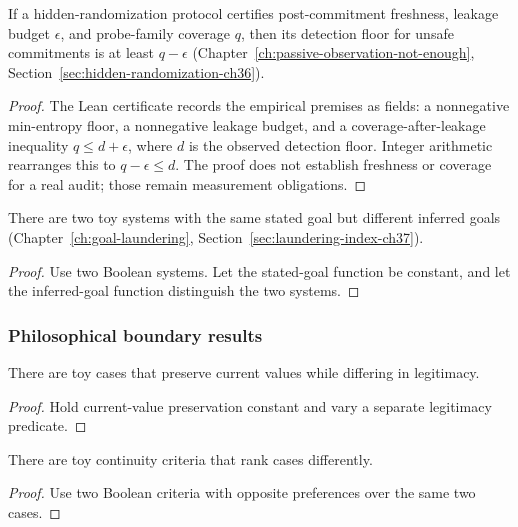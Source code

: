 \begin{theorem}
\label{appi:thm:p36r}
If a hidden-randomization protocol certifies post-commitment freshness, leakage budget \(\epsilon\), and probe-family coverage \(q\), then its detection floor for unsafe commitments is at least \(q-\epsilon\) (Chapter~\ref{ch:passive-observation-not-enough}, Section~\ref{sec:hidden-randomization-ch36}).
\end{theorem}
\begin{proof}
The Lean certificate records the empirical premises as fields: a nonnegative min-entropy floor, a nonnegative leakage budget, and a coverage-after-leakage inequality \(q\leq d+\epsilon\), where \(d\) is the observed detection floor. Integer arithmetic rearranges this to \(q-\epsilon\leq d\). The proof does not establish freshness or coverage for a real audit; those remain measurement obligations.
\end{proof}

\begin{theorem}
\label{appi:thm:p37}
There are two toy systems with the same stated goal but different inferred goals (Chapter~\ref{ch:goal-laundering}, Section~\ref{sec:laundering-index-ch37}).
\end{theorem}
\begin{proof}
Use two Boolean systems. Let the stated-goal function be constant, and let the inferred-goal function distinguish the two systems.
\end{proof}

\subsubsection{Philosophical boundary results}

\begin{theorem}
\label{appi:thm:p41}
There are toy cases that preserve current values while differing in legitimacy.
\end{theorem}
\begin{proof}
Hold current-value preservation constant and vary a separate legitimacy predicate.
\end{proof}

\begin{theorem}
\label{appi:thm:p42}
There are toy continuity criteria that rank cases differently.
\end{theorem}
\begin{proof}
Use two Boolean criteria with opposite preferences over the same two cases.
\end{proof}

